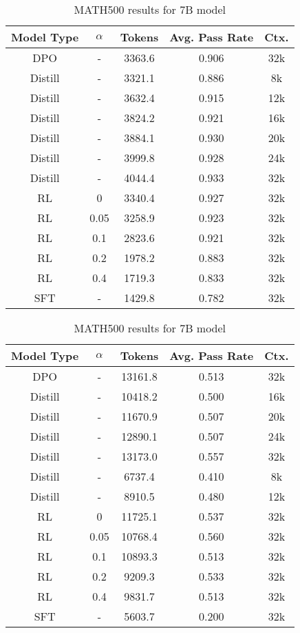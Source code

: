 \begin{center}
\begin{table}
\begin{tabular}{ccccc}
\hline
\textbf{Model Type} & \textbf{$\alpha$} & \textbf{Tokens} & \textbf{Avg. Pass Rate} & \textbf{Ctx.} \\ \hline
DPO & - & 3363.6 & 0.906 & 32k \\
Distill & - & 3321.1 & 0.886 & 8k \\
Distill & - & 3632.4 & 0.915 & 12k \\
Distill & - & 3824.2 & 0.921 & 16k \\
Distill & - & 3884.1 & 0.930 & 20k \\
Distill & - & 3999.8 & 0.928 & 24k \\
Distill & - & 4044.4 & 0.933 & 32k \\
RL & 0 & 3340.4 & 0.927 & 32k \\
RL & 0.05 & 3258.9 & 0.923 & 32k \\
RL & 0.1 & 2823.6 & 0.921 & 32k \\
RL & 0.2 & 1978.2 & 0.883 & 32k \\
RL & 0.4 & 1719.3 & 0.833 & 32k \\
SFT & - & 1429.8 & 0.782 & 32k\\
\hline
\end{tabular}

\caption{MATH500 results for 7B model}
\label{table:MATH500_7B}

\vspace{2.5em}

\begin{tabular}{ccccc}
\hline
\textbf{Model Type} & \textbf{$\alpha$} & \textbf{Tokens} & \textbf{Avg. Pass Rate} & \textbf{Ctx.} \\ \hline
DPO & - & 13161.8 & 0.513 & 32k \\
Distill & - & 10418.2 & 0.500 & 16k \\
Distill & - & 11670.9 & 0.507 & 20k \\
Distill & - & 12890.1 & 0.507 & 24k \\
Distill & - & 13173.0 & 0.557 & 32k \\
Distill & - & 6737.4 & 0.410 & 8k \\
Distill & - & 8910.5 & 0.480 & 12k \\
RL & 0 & 11725.1 & 0.537 & 32k \\
RL & 0.05 & 10768.4 & 0.560 & 32k \\
RL & 0.1 & 10893.3 & 0.513 & 32k \\
RL & 0.2 & 9209.3 & 0.533 & 32k \\
RL & 0.4 & 9831.7 & 0.513 & 32k \\
SFT & - & 5603.7 & 0.200 & 32k\\
\hline
\end{tabular}


\end{table}
\end{center}
